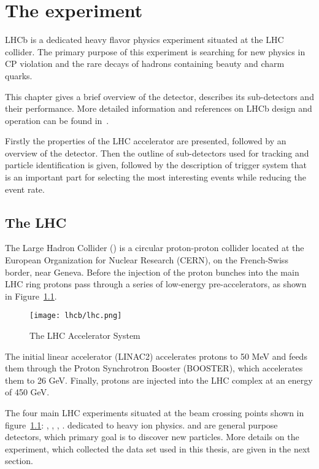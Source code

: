 \chapter{The \lhcb experiment}
\label{ch_lhcb}

LHCb is a dedicated heavy flavor physics experiment situated at the LHC collider.
The primary purpose of this experiment is searching for new physics in CP
violation and the rare decays of hadrons containing beauty and charm quarks.

This chapter gives a brief overview of the \lhcb detector, describes its
sub-detectors and their performance. More detailed information and references
on LHCb design and operation can be found in~\cite{Alves:2008zz}.

Firstly the properties of the LHC accelerator are presented, followed by an
overview of the \lhcb detector. Then the outline of sub-detectors used for
tracking and particle identification is given, followed by the description of
trigger system that is an important part for selecting the most interesting
events while reducing the event rate. 

\section{The LHC}
\label{ch_lhcb:lhc}

The Large Hadron Collider (\lhc) is a circular proton-proton collider located
at the European Organization for Nuclear Research (CERN), on the French-Swiss
border, near Geneva. Before the injection of the proton bunches into the main
LHC ring protons pass through a series of low-energy pre-accelerators, as shown
in Figure~\ref{fig:lhc}.

\begin{figure}[tb]
\centering
\texttt{[image: lhcb/lhc.png]}
\caption{\small The LHC Accelerator System}
\label{fig:lhc}
\end{figure}

The initial linear accelerator (LINAC2) accelerates protons to 50 MeV and 
feeds them through the Proton Synchrotron Booster (BOOSTER), which
accelerates them to 26 GeV. Finally, protons are injected into the LHC
complex at an energy of 450 GeV.

The four main LHC experiments situated at the beam crossing points shown in
figure~\ref{fig:lhc}: \atlas, \alice, \cms, \lhcb. \alice dedicated to heavy
ion physics. \atlas and \cms are general purpose detectors, which primary goal is
to discover new particles. More details on the \lhcb experiment, which collected the 
data set used in this thesis, are given in the next section.


